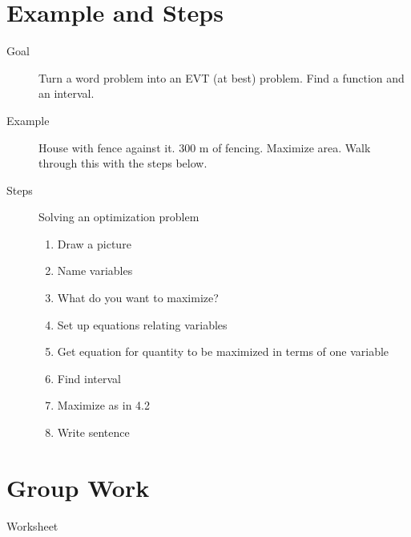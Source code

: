 \documentclass[11pt]{article}
\begin{document}
\drawtitle

\section*{Example and Steps}
\begin{description}
\item[Goal] Turn a word problem into an EVT (at best) problem.  Find a
  function and an interval.
\item[Example] House with fence against it. 300 m of fencing. Maximize
  area.  Walk through this with the steps below.
\item[Steps] Solving an optimization problem
  \begin{enumerate}
  \item Draw a picture
  \item Name variables
  \item What do you want to maximize?
  \item Set up equations relating variables
  \item Get equation for quantity to be maximized in terms of one
    variable
  \item Find interval
  \item Maximize as in 4.2
  \item Write sentence
  \end{enumerate}
\end{description}

\section*{Group Work}
\begin{description}
\item[Worksheet] 
\end{description}
\end{document}
